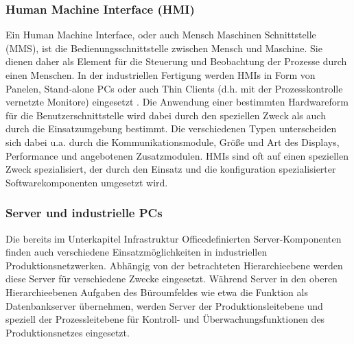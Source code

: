 \subsubsection{Human Machine Interface (HMI)}
Ein Human Machine Interface, oder auch Mensch Maschinen Schnittstelle (MMS), ist die Bedienungsschnittstelle zwischen Mensch und Maschine. Sie dienen daher als Element für die Steuerung und Beobachtung der Prozesse durch einen Menschen. In der industriellen Fertigung werden HMIs in Form von Panelen, Stand-alone PCs oder auch Thin Clients (d.h. mit der Prozesskontrolle vernetzte Monitore) eingesetzt \citep{HMI1}. 
Die Anwendung einer bestimmten Hardwareform für die Benutzerschnittstelle wird dabei durch den speziellen Zweck als auch durch die Einsatzumgebung bestimmt. Die verschiedenen Typen unterscheiden sich dabei u.a. durch die Kommunikationsmodule, Größe und Art des Displays, Performance und angebotenen Zusatzmodulen\citep{HMI2}.
HMIs sind oft auf einen speziellen Zweck spezialisiert, der durch den Einsatz und die konfiguration spezialisierter Softwarekomponenten umgesetzt wird\citep{HMI1}. 

\subsubsection{Server und industrielle PCs}
Die bereits im Unterkapitel \glqq Infrastruktur Office\grqq  definierten Server-Komponenten finden auch verschiedene Einsatzmöglichkeiten in industriellen Produktionsnetzwerken. Abhängig von der betrachteten Hierarchieebene werden diese Server für verschiedene Zwecke eingesetzt. Während Server in den oberen Hierarchieebenen Aufgaben des Büroumfeldes wie etwa die Funktion als Datenbankserver übernehmen, werden Server der Produktionsleitebene und speziell der Prozessleitebene für Kontroll- und Überwachungsfunktionen des Produktionsnetzes eingesetzt. 


